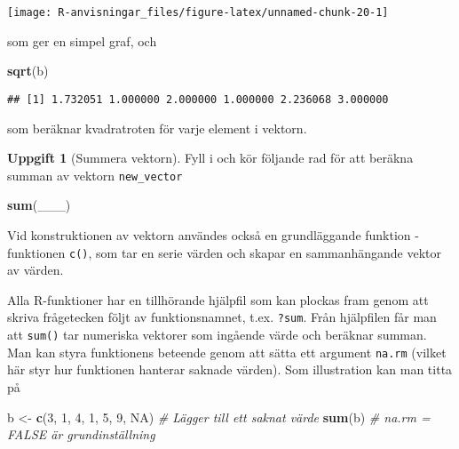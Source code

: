 \documentclass[
]{book}
\newenvironment{Shaded}{\begin{snugshade}}{\end{snugshade}}
\newcommand{\CommentTok}[1]{\textcolor[rgb]{0.56,0.35,0.01}{\textit{#1}}}
\newcommand{\ConstantTok}[1]{\textcolor[rgb]{0.56,0.35,0.01}{#1}}
\newcommand{\DecValTok}[1]{\textcolor[rgb]{0.00,0.00,0.81}{#1}}
\newcommand{\FunctionTok}[1]{\textcolor[rgb]{0.13,0.29,0.53}{\textbf{#1}}}
\newcommand{\NormalTok}[1]{#1}
\newcommand{\OtherTok}[1]{\textcolor[rgb]{0.56,0.35,0.01}{#1}}
\theoremstyle{definition}
\theoremstyle{definition}
\theoremstyle{definition}
\newtheorem{exercise}{Uppgift}[chapter]
\theoremstyle{definition}
\theoremstyle{remark}
\begin{document}
\begin{center}\texttt{[image: R-anvisningar\_files/figure-latex/unnamed-chunk-20-1]} \end{center}

som ger en simpel graf, och

\begin{Shaded}
\begin{Highlighting}[]
\FunctionTok{sqrt}\NormalTok{(b)}
\end{Highlighting}
\end{Shaded}

\begin{verbatim}
## [1] 1.732051 1.000000 2.000000 1.000000 2.236068 3.000000
\end{verbatim}

som beräknar kvadratroten för varje element i vektorn.

\begin{exercise}[Summera vektorn]

Fyll i och kör följande rad för att beräkna summan av vektorn \texttt{new\_vector}

\begin{Shaded}
\begin{Highlighting}[]
\FunctionTok{sum}\NormalTok{(\_\_\_)}
\end{Highlighting}
\end{Shaded}

\end{exercise}

Vid konstruktionen av vektorn användes också en grundläggande funktion - funktionen \texttt{c()}, som tar en serie värden och skapar en sammanhängande vektor av värden.

Alla R-funktioner har en tillhörande hjälpfil som kan plockas fram genom att skriva frågetecken följt av funktionsnamnet, t.ex. \texttt{?sum}. Från hjälpfilen får man att \texttt{sum()} tar numeriska vektorer som ingående värde och beräknar summan. Man kan styra funktionens beteende genom att sätta ett argument \texttt{na.rm} (vilket här styr hur funktionen hanterar saknade värden). Som illustration kan man titta på

\begin{Shaded}
\begin{Highlighting}[]
\NormalTok{b }\OtherTok{\textless{}{-}} \FunctionTok{c}\NormalTok{(}\DecValTok{3}\NormalTok{, }\DecValTok{1}\NormalTok{, }\DecValTok{4}\NormalTok{, }\DecValTok{1}\NormalTok{, }\DecValTok{5}\NormalTok{, }\DecValTok{9}\NormalTok{, }\ConstantTok{NA}\NormalTok{)           }\CommentTok{\# Lägger till ett saknat värde}
\FunctionTok{sum}\NormalTok{(b)                                 }\CommentTok{\# na.rm = FALSE är grundinställning}
\end{Highlighting}
\end{Shaded}
\end{document}
